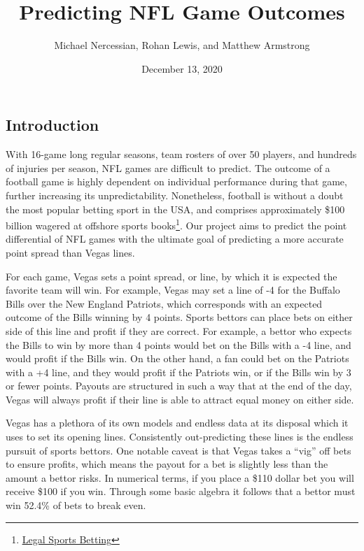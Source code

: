 \documentclass{article}
\title{Predicting NFL Game Outcomes}
\author{Michael Nercessian, Rohan Lewis, and Matthew Armstrong}
\date{December 13, 2020}
\begin{document}
\maketitle

\begin{multicols}{2}

\section{Introduction}

With 16-game long regular seasons, team rosters of over 50 players, and hundreds of injuries per season, NFL games are difficult to predict. The outcome of a football game is highly dependent on individual performance during that game, further increasing its unpredictability. Nonetheless, football is without a doubt the most popular betting sport in the USA, and comprises approximately \$100 billion wagered at offshore sports books\footnote{\href{https://www.legalsportsbetting.com/how-much-money-do-americans-bet-on-sports/}{\underline{Legal Sports Betting}} }. Our project aims to predict the point differential of NFL games with the ultimate goal of predicting a more accurate point spread than Vegas lines.

For each game, Vegas sets a point spread, or line, by which it is expected the favorite team will win. For example, Vegas may set a line of -4 for the Buffalo Bills over the New England Patriots, which corresponds with an expected outcome of the Bills winning by 4 points. Sports bettors can place bets on either side of this line and profit if they are correct. For example, a bettor who expects the Bills to win by more than 4 points would bet on the Bills with a -4 line, and would profit if the Bills win. On the other hand, a fan could bet on the Patriots with a +4 line, and they would profit if the Patriots win, or if the Bills win by 3 or fewer points. Payouts are structured in such a way that at the end of the day, Vegas will always profit if their line is able to attract equal money on either side. 

Vegas has a plethora of its own models and endless data at its disposal which it uses to set its opening lines. Consistently out-predicting these lines is the endless pursuit of sports bettors. One notable caveat is that Vegas takes a “vig” off bets to ensure profits, which means the payout for a bet is slightly less than the amount a bettor risks. In numerical terms, if you place a \$110 dollar bet you will receive \$100 if you win. Through some basic algebra it follows that a bettor must win 52.4\% of bets to break even.


\end{multicols}
\end{document}
